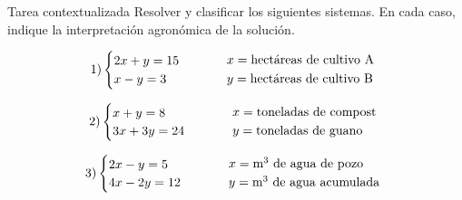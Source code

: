 \documentclass[aspectratio=169]{beamer}
\begin{document}
\begin{frame}{Tarea contextualizada}
	\small
	Resolver y clasificar los siguientes sistemas. En cada caso, indique la interpretación agronómica de la solución.
	
	\[
	1)
	\begin{cases}
		2x+y=15\\
		x-y=3
	\end{cases}
	\qquad
	\begin{array}{l}
	 x=\text{hectáreas de cultivo A}\vspace{1mm}\\
	 y=\text{hectáreas de cultivo B}
	\end{array}
	\]
	
	\[
	2)
	\begin{cases}
		x+y=8\\
		3x+3y=24
	\end{cases}
	\qquad
	\begin{array}{l}
	 x=\text{toneladas de compost}\vspace{1mm}\\
	 y=\text{toneladas de guano}
	\end{array}
	\]
	
	\[
	3)
	\begin{cases}
		2x-y=5\\
		4x-2y=12
	\end{cases}
	\qquad
	\begin{array}{l}
	 x=\text{m}^{3}\text{ de agua de pozo}\vspace{1mm}\\
	 y=\text{m}^{3}\text{ de agua acumulada}
	\end{array}
	\]
\end{frame}
	
\end{document}
